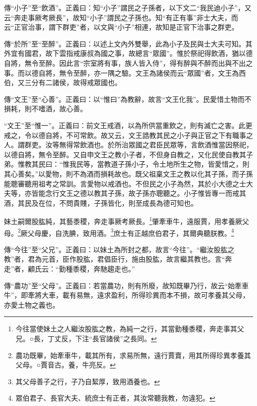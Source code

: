 {\noindent\zhuan{}\fzbyks 傳“小子”至“飲酒”。正義曰：知“小子”謂民之子孫者，以下文二“我民迪小子”，又云“奔走事厥考厥長”，故知“小子”謂民之子孫也。知“有正有事”非士大夫，而云“正官治事，謂下群吏”者，以文與“小子”相連，故知是正官下治事之群吏。 \par}

{\noindent\zhuan{}\fzbyks 傳“於所”至“至醉”。正義曰：以述上文內外雙舉，此為小子及民與士大夫可知。其外宜有國君，故下雲指戒康叔為國之事，故總言“眾國”。惟於祭祀得飲酒，猶以德自將，無令至醉。因此言“宗室將有事，族人皆入侍”，得有醉與不醉而出與不出之事。而以德自將，無令至醉，亦一隅之驗。文王為諸侯而云“眾國”者，文王為西伯，又三分有二諸侯，故得戒眾國也。 \par}

{\noindent\zhuan{}\fzbyks 傳“文王”至“心善”。正義曰：以“惟曰”為教辭，故言“文王化我”。民愛惜土物而不損耗，則不嗜酒，故心善。 \par}

{\noindent\shu{}\fzkt “文王”至“惟一”。正義曰：前文王戒酒，以為所供當重飲之，則有滅亡之害。此更戒之，令以德自將，不可常飲。故又云，文王誥教其民之小子與正官之下有職事之人。謂群吏。汝等無得常飲酒也。於所治眾國之君臣民眾等，言飲酒惟當因祭祀，以德自將，無令至醉。又自申文王之教小子者，不但身自教之，又化民使自教其子弟。惟教其民曰：“惟我民等，當教道子孫小子，令土地所生之物，皆愛惜之，則其心善矣。”以愛物，則不為酒而損耗故也。既父祖稟文王之教以化其子孫，而子孫能聰審聽用祖考之常訓。言愛物以戒酒也。不但民之小子為然，其於小大德之士大夫等，亦皆能念行文王之德以教其子孫，故子孫亦聰聽之。小子惟皆專一而戒其酒，其民及在位，不問貴賤，子孫皆化，則至成長為德可知也。 \par}

妹土嗣爾股肱純，其藝黍稷，奔走事厥考厥長。\footnote{今往當使妹土之人繼汝股肱之教，為純一之行，其當勤種黍稷，奔走事其父兄。○長，丁丈反，下注“長官諸侯”之長同。}肇牽車牛，遠服賈，用孝養厥父母。\footnote{農功既畢，始牽車牛，載其所有，求易所無，遠行賈賣，用其所得珍異孝養其父母。○賈音古。養，牛亮反。}厥父母慶，自洗腆，致用酒。\footnote{其父母善子之行，子乃自絜厚，致用酒養也。}庶士有正越庶伯君子，其爾典聽朕教。\footnote{眾伯君子、長官大夫、統庶士有正者，其汝常聽我教，勿違犯。}


{\noindent\zhuan{}\fzbyks 傳“今往”至“父兄”。正義曰：以妹土為所封之都，故言“今往”。“繼汝股肱之教”者，君為元首，臣作股肱，君倡臣行，施由股肱，故言繼其教也。言“奔走”者，顧氏云：“勤種黍稷，奔馳趨走也。” \par}

{\noindent\zhuan{}\fzbyks 傳“農功”至“父母”。正義曰：若當農功，則有所廢，故知既畢乃行，故云“始牽車牛”，即牽將大車，載有易無，遠求盈利，所得珍異而本不損，故可孝養其父母，亦愛土物之義也。 \par}

